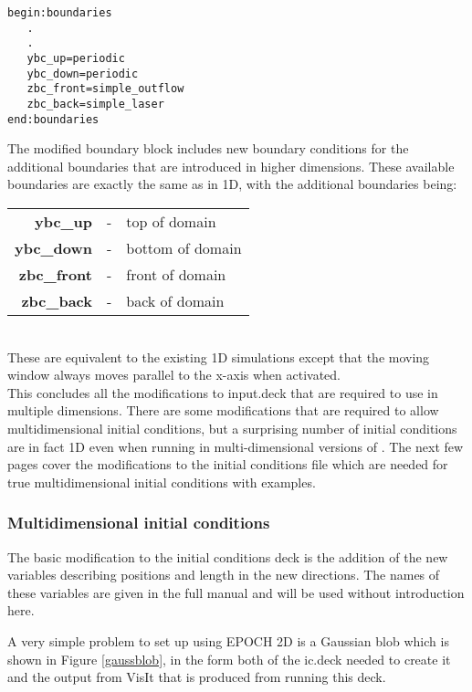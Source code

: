 \documentclass[12pt,a4paper]{article}
\newcommand{\boxverbatim}[1]{\begin{Verbatim}[obeytabs=true,frame=single,
  framerule=0.5mm,rulecolor=\color{warwickmid},formatcom=\color{black},label=#1]}
\newcommand{\inlineemph}[1]{{\color{warwicklight} \bf{#1}}}
\newcommand{\EPOCH}{{\color{warwickdark}\fontfamily{phv}\selectfont{EPOCH}}}
\begin{document}
\boxverbatim{Changed boundaries block}
begin:boundaries
   .
   .
   ybc_up=periodic
   ybc_down=periodic
   zbc_front=simple_outflow
   zbc_back=simple_laser
end:boundaries
\end{Verbatim}

The modified boundary block includes new boundary conditions for the additional
boundaries that are introduced in higher dimensions. These available boundaries
are exactly the same as in 1D, with the additional boundaries being:\\

\begin{tabular}{rcl}
\inlineemph{ybc\_up}    &-& top of domain\\
\inlineemph{ybc\_down}  &-& bottom of domain\\
\inlineemph{zbc\_front} &-& front of domain\\
\inlineemph{zbc\_back}  &-& back of domain\\
\end{tabular} \\

These are equivalent to the existing 1D simulations except that the moving
window always moves parallel to the x-axis when activated.\\ This concludes all
the modifications to input.deck that are required to use {\EPOCH} in multiple
dimensions. There are some modifications that are required to allow
multidimensional initial conditions, but a surprising number of initial
conditions are in fact 1D even when running in multi-dimensional versions of
\EPOCH. The next few pages cover the modifications to the initial conditions
file which are needed for true multidimensional initial conditions with
examples.

\subsubsection{Multidimensional initial conditions}

The basic modification to the {\EPOCH} initial conditions deck is the addition of
the new variables describing positions and length in the new directions. The
names of these variables are given in the full manual and will be used without
introduction here.

A very simple problem to set up using EPOCH 2D is a Gaussian blob which is
shown in Figure \ref{gaussblob}, in the form both of the ic.deck needed to
create it and the output from VisIt that is produced from running this deck.
\end{document}
